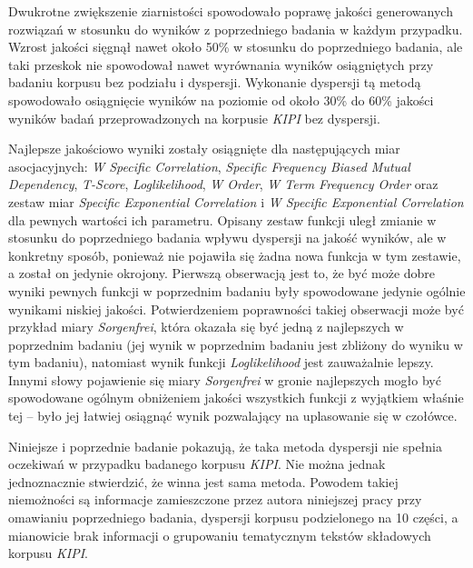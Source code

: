 Dwukrotne zwiększenie ziarnistości spowodowało poprawę jakości generowanych rozwiązań w stosunku do wyników z poprzedniego badania w każdym przypadku.
Wzrost jakości sięgnął nawet około 50\% w stosunku do poprzedniego badania, ale taki przeskok nie spowodował nawet wyrównania wyników osiągniętych przy badaniu korpusu bez podziału i dyspersji.
Wykonanie dyspersji tą metodą spowodowało osiągnięcie wyników na poziomie od około 30\% do 60\% jakości wyników badań przeprowadzonych na korpusie \emph{KIPI} bez dyspersji.

\par
Najlepsze jakościowo wyniki zostały osiągnięte dla następujących miar asocjacyjnych: \emph{W Specific Correlation}, \emph{Specific Frequency Biased Mutual Dependency}, \emph{T-Score}, \emph{Loglikelihood}, \emph{W Order}, \emph{W Term Frequency Order} oraz zestaw miar \emph{Specific Exponential Correlation} i \emph{W Specific Exponential Correlation} dla pewnych wartości ich parametru.
Opisany zestaw funkcji uległ zmianie w stosunku do poprzedniego badania wpływu dyspersji na jakość wyników, ale w konkretny sposób, ponieważ nie pojawiła się żadna nowa funkcja w tym zestawie, a został on jedynie okrojony.
Pierwszą obserwacją jest to, że być może dobre wyniki pewnych funkcji w poprzednim badaniu były spowodowane jedynie ogólnie wynikami niskiej jakości.
Potwierdzeniem poprawności takiej obserwacji może być przykład miary \emph{Sorgenfrei}, która okazała się być jedną z najlepszych w poprzednim badaniu (jej wynik w poprzednim badaniu jest zbliżony do wyniku w tym badaniu), natomiast wynik funkcji \emph{Loglikelihood} jest zauważalnie lepszy.
Innymi słowy pojawienie się miary \emph{Sorgenfrei} w gronie najlepszych mogło być spowodowane ogólnym obniżeniem jakości wszystkich funkcji z wyjątkiem właśnie tej -- było jej łatwiej osiągnąć wynik pozwalający na uplasowanie się w czołówce.

\par
Niniejsze i poprzednie badanie pokazują, że taka metoda dyspersji nie spełnia oczekiwań w przypadku badanego korpusu \emph{KIPI}.
Nie można jednak jednoznacznie stwierdzić, że winna jest sama metoda.
Powodem takiej niemożności są informacje zamieszczone przez autora niniejszej pracy przy omawianiu poprzedniego badania, dyspersji korpusu podzielonego na 10 części, a mianowicie brak informacji o grupowaniu tematycznym tekstów składowych korpusu \emph{KIPI}.


